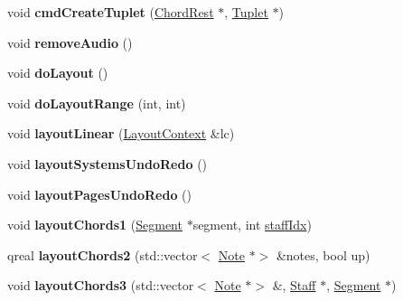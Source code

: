 \begin{DoxyCompactItemize}
\item 
\mbox{\label{class_ms_1_1_score_a3d96b673e1e5c8a6037d63ab97b99560}} 
void {\bfseries cmd\+Create\+Tuplet} (\hyperlink{class_ms_1_1_chord_rest}{Chord\+Rest} $\ast$, \hyperlink{class_ms_1_1_tuplet}{Tuplet} $\ast$)
\item 
\mbox{\label{class_ms_1_1_score_a1decbb1a420564aba93734430e02e28a}} 
void {\bfseries remove\+Audio} ()
\item 
\mbox{\label{class_ms_1_1_score_a50e6e934be473faa8cc345e9d66b1a7a}} 
void {\bfseries do\+Layout} ()
\item 
\mbox{\label{class_ms_1_1_score_a214a5125ec6ee8aa3adc75370ff4c748}} 
void {\bfseries do\+Layout\+Range} (int, int)
\item 
\mbox{\label{class_ms_1_1_score_a779fa71d1ad532f4fe7f280b3e886913}} 
void {\bfseries layout\+Linear} (\hyperlink{struct_ms_1_1_layout_context}{Layout\+Context} \&lc)
\item 
\mbox{\label{class_ms_1_1_score_a812950264227aabe24fcc915814dbba4}} 
void {\bfseries layout\+Systems\+Undo\+Redo} ()
\item 
\mbox{\label{class_ms_1_1_score_a588185e96d270ac7180feb46b2d548ab}} 
void {\bfseries layout\+Pages\+Undo\+Redo} ()
\item 
\mbox{\label{class_ms_1_1_score_aabf8eae8fbefcade6724ea507c16a9ed}} 
void {\bfseries layout\+Chords1} (\hyperlink{class_ms_1_1_segment}{Segment} $\ast$segment, int \hyperlink{class_ms_1_1_score_aa4353d2ea4660f134a9030dbf9216b25}{staff\+Idx})
\item 
\mbox{\label{class_ms_1_1_score_a047fa69a68b80e772ad8fd9f85d2c837}} 
qreal {\bfseries layout\+Chords2} (std\+::vector$<$ \hyperlink{class_ms_1_1_note}{Note} $\ast$$>$ \&notes, bool up)
\item 
\mbox{\label{class_ms_1_1_score_ac801c8ac2033b7062c849f7e4e821463}} 
void {\bfseries layout\+Chords3} (std\+::vector$<$ \hyperlink{class_ms_1_1_note}{Note} $\ast$$>$ \&, \hyperlink{class_ms_1_1_staff}{Staff} $\ast$, \hyperlink{class_ms_1_1_segment}{Segment} $\ast$)

\end{DoxyCompactItemize}
